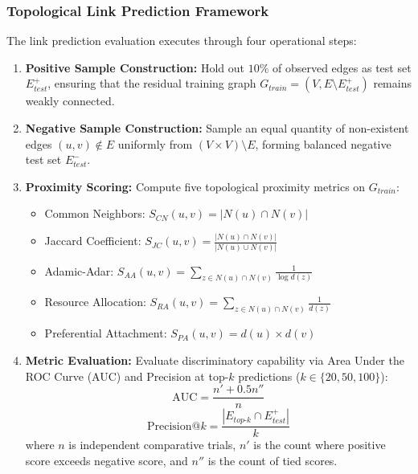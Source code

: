 \documentclass[conference]{IEEEtran}
\begin{document}
\subsubsection{Topological Link Prediction Framework}
The link prediction evaluation executes through four operational steps:
\begin{enumerate}
    \item \textbf{Positive Sample Construction:} Hold out $10\%$ of observed edges as test set $E_{test}^+$, ensuring that the residual training graph $G_{train} = (V, E \setminus E_{test}^+)$ remains weakly connected.
    \item \textbf{Negative Sample Construction:} Sample an equal quantity of non-existent edges $(u, v) \notin E$ uniformly from $(V \times V) \setminus E$, forming balanced negative test set $E_{test}^-$.
    \item \textbf{Proximity Scoring:} Compute five topological proximity metrics on $G_{train}$:
    \begin{itemize}
        \item Common Neighbors: $S_{CN}(u, v) = |N(u) \cap N(v)|$
        \item Jaccard Coefficient: $S_{JC}(u, v) = \frac{|N(u) \cap N(v)|}{|N(u) \cup N(v)|}$
        \item Adamic-Adar: $S_{AA}(u, v) = \sum_{z \in N(u) \cap N(v)} \frac{1}{\log d(z)}$
        \item Resource Allocation: $S_{RA}(u, v) = \sum_{z \in N(u) \cap N(v)} \frac{1}{d(z)}$
        \item Preferential Attachment: $S_{PA}(u, v) = d(u) \times d(v)$
    \end{itemize}
    \item \textbf{Metric Evaluation:} Evaluate discriminatory capability via Area Under the ROC Curve (AUC) and Precision at top-$k$ predictions ($k \in \{20, 50, 100\}$):
    \begin{equation}
        \text{AUC} = \frac{n' + 0.5 n''}{n}
        \label{eq:auc}
    \end{equation}
    \begin{equation}
        \text{Precision@}k = \frac{|E_{top\text{-}k} \cap E_{test}^+|}{k}
        \label{eq:precision}
    \end{equation}
    where $n$ is independent comparative trials, $n'$ is the count where positive score exceeds negative score, and $n''$ is the count of tied scores.
\end{enumerate}
\end{document}
